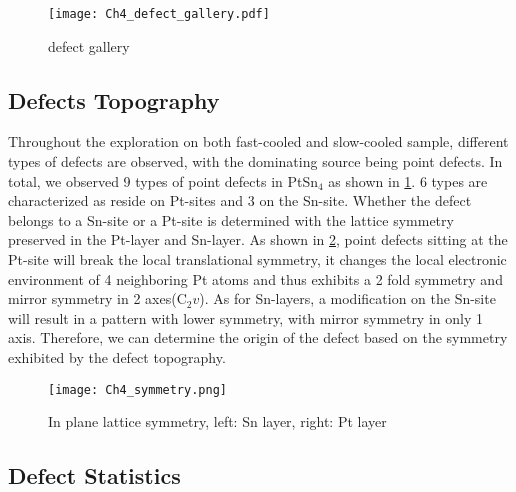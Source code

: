 \begin{figure}
	\centering
	\texttt{[image: Ch4\_defect\_gallery.pdf]}
	\caption{defect gallery}
	\label{fig:ch4_defectgallery}
\end{figure}

\subsection{Defects Topography}
Throughout the exploration on both fast-cooled and slow-cooled sample, different types of defects are observed, with the dominating source being point defects. In total, we observed 9 types of point defects in PtSn$_4$ as shown in \ref{fig:ch4_defectgallery}. 6 types are characterized as reside on Pt-sites and 3 on the Sn-site. Whether the defect belongs to a Sn-site or a Pt-site is determined with the lattice symmetry preserved in the Pt-layer and Sn-layer. As shown in \ref{fig:ch4_symmetry}, point defects sitting at the Pt-site will break the local translational symmetry, it changes the local electronic environment of 4 neighboring Pt atoms and thus exhibits a 2 fold symmetry and mirror symmetry in 2 axes(C$_2v$). As for Sn-layers, a modification on the Sn-site will result in a pattern with lower symmetry, with mirror symmetry in only 1 axis. Therefore, we can determine the origin of the defect based on the symmetry exhibited by the defect topography. 

\begin{figure}
	\centering
	\texttt{[image: Ch4\_symmetry.png]}
	\caption{In plane lattice symmetry, left: Sn layer, right: Pt layer}
	\label{fig:ch4_symmetry}
\end{figure}

\subsection{Defect Statistics}


